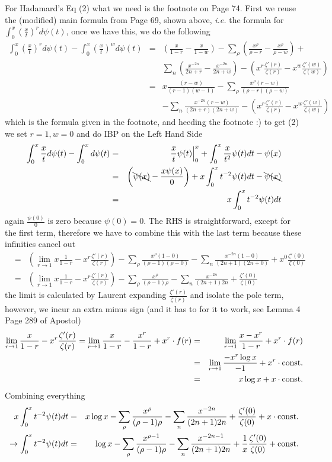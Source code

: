 \documentclass[aps,preprint,preprintnumbers,nofootinbib,showpacs,prd]{revtex4-1}
\newcommand{\ie}{{\it i.e.} }
\newcommand{\nbea}{\begin{eqnarray*}}
\newcommand{\neea}{\end{eqnarray*}}
\begin{document}
For Hadamard's Eq (2) what we need is the footnote on Page 74. First we reuse the (modified) main formula from Page 69, shown above, \ie the formula for $\int_0^x \left(\frac{x}{t}\right)^{r} d\psi(t)$, once we have this, we do the following
%
\nbea
\int_0^x \left(\frac{x}{t}\right)^{r} d\psi(t) - \int_0^x \left(\frac{x}{t}\right)^{w} d\psi(t) & = & \left(\frac{x}{1-r} - \frac{x}{1-w} \right ) - \sum_\rho \left(\frac{x^{\rho}}{\rho-r} - \frac{x^{\rho}}{\rho-w} \right) + \\
&& \sum_n \left(\frac{x^{-2n}}{2n+r} - \frac{x^{-2n}}{2n+w}\right) - \left(x^r\frac{\zeta'(r)}{\zeta(r)} - x^w\frac{\zeta'(w)}{\zeta(w)} \right ) \\
& = & x \frac{(r-w)}{(r-1)(w-1)} - \sum_\rho \frac{x^{\rho} (r-w)}{(\rho-r)(\rho-w)} \\
&& - \sum_n \frac{x^{-2n}(r-w)}{(2n+r)(2n+w)} - \left(x^r\frac{\zeta'(r)}{\zeta(r)} - x^w\frac{\zeta'(w)}{\zeta(w)} \right )
\neea
%
which is the formula given in the footnote, and heeding the footnote :) to get (2) we set $r = 1, w = 0$ and do IBP on the Left Hand Side
%
\nbea
\int_0^x \frac{x}{t} d\psi(t) - \int_0^x d\psi(t) & = &  \left.\frac{x}{t} \psi(t) \right |_0^x + \int_0^x \frac{x}{t^2} \psi(t) dt - \psi(x) \\
& = & \left ( \bcancel{\psi(x)} - \frac{x\psi(x)}{0}\right ) + x \int_0^x t^{-2} \psi(t) dt - \bcancel{\psi(x)} \\
& = & x \int_0^x t^{-2} \psi(t) dt
\neea
%
again $\frac{\psi(0)}{0}$ is zero because $\psi(0) = 0$. The RHS is straightforward, except for the first term, therefore we have to combine this with the last term because these infinities cancel out
%
\nbea
& = & \left (\lim_{r\to1} x \frac{1}{1-r} - x^r\frac{\zeta'(r)}{\zeta(r)} \right) - \sum_\rho \frac{x^{\rho} (1-0)}{(\rho-1)(\rho-0)} - \sum_n \frac{x^{-2n}(1-0)}{(2n+1)(2n+0)} + x^0\frac{\zeta'(0)}{\zeta(0)} \\
& = & \left (\lim_{r\to1} x \frac{1}{1-r} - x^r\frac{\zeta'(r)}{\zeta(r)} \right) - \sum_\rho \frac{x^{\rho}}{(\rho-1)\rho} - \sum_n \frac{x^{-2n}}{(2n+1)2n} + \frac{\zeta'(0)}{\zeta(0)}
\neea
%
the limit is calculated by Laurent expanding $\frac{\zeta'(r)}{\zeta(r)}$ and isolate the pole term, however, we incur an extra minus sign (and it has to for it to work, see Lemma 4 Page 289 of Apostol)
%
\nbea
\lim_{r\to 1}\frac{x}{1-r} - x^r\frac{\zeta'(r)}{\zeta(r)} = \lim_{r\to 1}\frac{x}{1-r} - \frac{x^r}{1-r}  + x^r \cdot f(r) & = & \lim_{r\to1} \frac{x-x^{r}}{1-r} + x^r \cdot f(r) \\
& = & \lim_{r\to1} \frac{-x^r \log x}{-1} + x^r \cdot {\rm const.} \\
& = & x \log x + x \cdot {\rm const.}
\neea
%
Combining everything
%
\nbea
x \int_0^x t^{-2} \psi(t) dt & = & x \log x - \sum_\rho \frac{x^{\rho}}{(\rho-1)\rho} - \sum_n \frac{x^{-2n}}{(2n+1)2n} + \frac{\zeta'(0)}{\zeta(0)} + x \cdot {\rm const.} \\
\to \int_0^x t^{-2} \psi(t) dt & = & \log x - \sum_\rho \frac{x^{\rho-1}}{(\rho-1)\rho} - \sum_n \frac{x^{-2n-1}}{(2n+1)2n} + \frac{1}{x}\frac{\zeta'(0)}{\zeta(0)} + {\rm const.}
\neea
%
\end{document}
